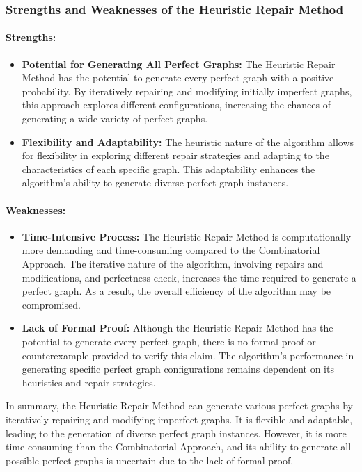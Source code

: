 \subsubsection{Strengths and Weaknesses of the Heuristic Repair Method}
\paragraph{Strengths:}

\begin{itemize}
\item \textbf{Potential for Generating All Perfect Graphs:} The Heuristic Repair Method has the potential to generate every perfect graph with a positive probability. By iteratively repairing and modifying initially imperfect graphs, this approach explores different configurations, increasing the chances of generating a wide variety of perfect graphs.
\item \textbf{Flexibility and Adaptability:} The heuristic nature of the algorithm allows for flexibility in exploring different repair strategies and adapting to the characteristics of each specific graph. This adaptability enhances the algorithm's ability to generate diverse perfect graph instances.
\end{itemize}

\paragraph{Weaknesses:}

\begin{itemize}
\item \textbf{Time-Intensive Process:} The Heuristic Repair Method is computationally more demanding and time-consuming compared to the Combinatorial Approach. The iterative nature of the algorithm, involving repairs and modifications, and perfectness check, increases the time required to generate a perfect graph. As a result, the overall efficiency of the algorithm may be compromised.
\item \textbf{Lack of Formal Proof:} Although the Heuristic Repair Method has the potential to generate every perfect graph, there is no formal proof or counterexample provided to verify this claim. The algorithm's performance in generating specific perfect graph configurations remains dependent on its heuristics and repair strategies.
\end{itemize}

In summary, the Heuristic Repair Method can generate various perfect graphs by iteratively repairing and modifying imperfect graphs. It is flexible and adaptable, leading to the generation of diverse perfect graph instances. However, it is more time-consuming than the Combinatorial Approach, and its ability to generate all possible perfect graphs is uncertain due to the lack of formal proof.